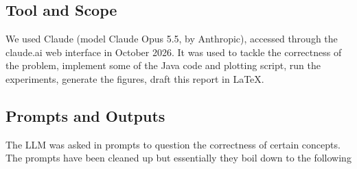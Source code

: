 \documentclass[conference]{IEEEtran}
\begin{document}
\subsection{Tool and Scope}

We used Claude (model Claude Opus 5.5, by Anthropic), accessed through the
claude.ai web interface in October 2026. It was used to tackle the correctness of the problem,
implement some of the Java code and plotting script, run the experiments, generate the
figures, draft this report in LaTeX.

\subsection{Prompts and Outputs}


The LLM was asked in prompts to question the correctness of certain concepts. The prompts have been cleaned up but essentially they boil down to the following
\end{document}
